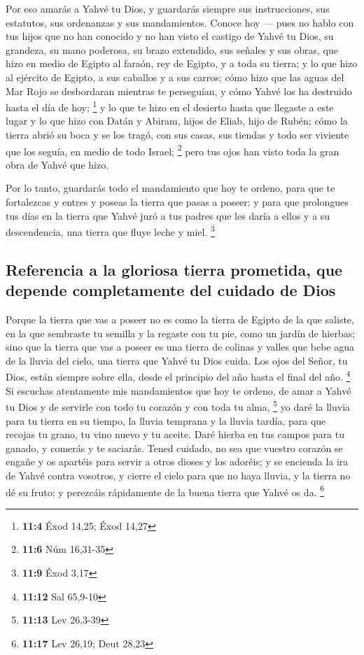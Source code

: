  Por eso amarás a Yahvé tu Dios, y guardarás siempre sus
instrucciones, sus estatutos, sus ordenanzas y sus mandamientos.
 Conoce hoy --- pues no hablo con tus hijos que no han
conocido y no han visto el castigo de Yahvé tu Dios, su grandeza, su
mano poderosa, su brazo extendido,  sus señales y sus
obras, que hizo en medio de Egipto al faraón, rey de Egipto, y a toda su
tierra;  y lo que hizo al ejército de Egipto, a sus
caballos y a sus carros; cómo hizo que las aguas del Mar Rojo se
desbordaran mientras te perseguían, y cómo Yahvé los ha destruido hasta
el día de hoy; \footnote{\textbf{11:4} Éxod 14,25; Éxod 14,27}
 y lo que te hizo en el desierto hasta que llegaste a este
lugar  y lo que hizo con Datán y Abiram, hijos de Eliab,
hijo de Rubén; cómo la tierra abrió su boca y se los tragó, con sus
casas, sus tiendas y todo ser viviente que los seguía, en medio de todo
Israel; \footnote{\textbf{11:6} Núm 16,31-35}  pero tus
ojos han visto toda la gran obra de Yahvé que hizo.

 Por lo tanto, guardarás todo el mandamiento que hoy te
ordeno, para que te fortalezcas y entres y poseas la tierra que pasas a
poseer;  y para que prolongues tus días en la tierra que
Yahvé juró a tus padres que les daría a ellos y a su descendencia, una
tierra que fluye leche y miel. \footnote{\textbf{11:9} Éxod 3,17}

\hypertarget{referencia-a-la-gloriosa-tierra-prometida-que-depende-completamente-del-cuidado-de-dios}{%
\subsection{Referencia a la gloriosa tierra prometida, que depende
completamente del cuidado de
Dios}\label{referencia-a-la-gloriosa-tierra-prometida-que-depende-completamente-del-cuidado-de-dios}}

 Porque la tierra que vas a poseer no es como la tierra
de Egipto de la que saliste, en la que sembraste tu semilla y la regaste
con tu pie, como un jardín de hierbas;  sino que la
tierra que vas a poseer es una tierra de colinas y valles que bebe agua
de la lluvia del cielo,  una tierra que Yahvé tu Dios
cuida. Los ojos del Señor, tu Dios, están siempre sobre ella, desde el
principio del año hasta el final del año. \footnote{\textbf{11:12} Sal
  65,9-10}  Si escuchas atentamente mis mandamientos que
hoy te ordeno, de amar a Yahvé tu Dios y de servirle con todo tu corazón
y con toda tu alma, \footnote{\textbf{11:13} Lev 26,3-39}
 yo daré la lluvia para tu tierra en su tiempo, la lluvia
temprana y la lluvia tardía, para que recojas tu grano, tu vino nuevo y
tu aceite.  Daré hierba en tus campos para tu ganado, y
comerás y te saciarás.  Tened cuidado, no sea que vuestro
corazón se engañe y os apartéis para servir a otros dioses y los
adoréis;  y se encienda la ira de Yahvé contra vosotros,
y cierre el cielo para que no haya lluvia, y la tierra no dé su fruto; y
perezcáis rápidamente de la buena tierra que Yahvé os da. \footnote{\textbf{11:17}
  Lev 26,19; Deut 28,23}

